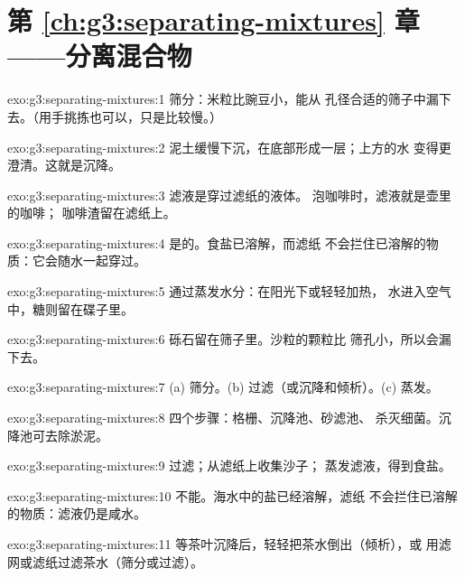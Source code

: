 \section*{第 \ref{ch:g3:separating-mixtures} 章——分离混合物}

\begin{solution}{exo:g3:separating-mixtures:1}
筛分：米粒比豌豆小，能从
孔径合适的筛子中漏下去。（用手挑拣也可以，只是比较慢。）
\end{solution}

\begin{solution}{exo:g3:separating-mixtures:2}
泥土缓慢下沉，在底部形成一层；上方的水
变得更澄清。这就是沉降。
\end{solution}

\begin{solution}{exo:g3:separating-mixtures:3}
滤液是穿过滤纸的液体。
泡咖啡时，滤液就是壶里的咖啡；
咖啡渣留在滤纸上。
\end{solution}

\begin{solution}{exo:g3:separating-mixtures:4}
是的。食盐已溶解，而滤纸
不会拦住已溶解的物质：它会随水一起穿过。
\end{solution}

\begin{solution}{exo:g3:separating-mixtures:5}
通过蒸发水分：在阳光下或轻轻加热，
水进入空气中，糖则留在碟子里。
\end{solution}

\begin{solution}{exo:g3:separating-mixtures:6}
砾石留在筛子里。沙粒的颗粒比
筛孔小，所以会漏下去。
\end{solution}

\begin{solution}{exo:g3:separating-mixtures:7}
(a) 筛分。(b) 过滤（或沉降和倾析）。(c) 蒸发。
\end{solution}

\begin{solution}{exo:g3:separating-mixtures:8}
四个步骤：格栅、沉降池、砂滤池、
杀灭细菌。沉降池可去除淤泥。
\end{solution}

\begin{solution}{exo:g3:separating-mixtures:9}
过滤；从滤纸上收集沙子；
蒸发滤液，得到食盐。
\end{solution}

\begin{solution}{exo:g3:separating-mixtures:10}
不能。海水中的盐已经溶解，滤纸
不会拦住已溶解的物质：滤液仍是咸水。
\end{solution}

\begin{solution}{exo:g3:separating-mixtures:11}
等茶叶沉降后，轻轻把茶水倒出（倾析），或
用滤网或滤纸过滤茶水（筛分或过滤）。
\end{solution}
